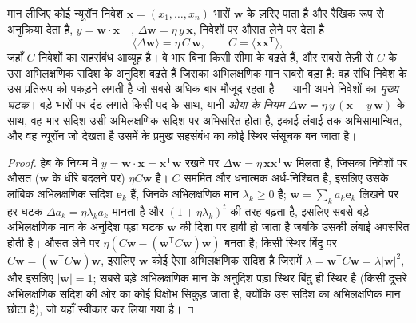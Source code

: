 \begin{theorem}[कोई हेबीय संधि क्या सीखती है]\label{thm:b3:learning-memory:hebb}
मान लीजिए कोई न्यूरॉन निवेश $\mathbf{x} = (x_{1},\dots,x_{n})$ भारों
$\mathbf{w}$ के ज़रिए पाता है
और रैखिक रूप से अनुक्रिया देता है, $y = \mathbf{w}\cdot\mathbf{x}$।
, $\Delta\mathbf{w} = \eta\, y\,\mathbf{x}$, निवेशों पर
औसत लेने पर देता है
\[
\langle\Delta\mathbf{w}\rangle = \eta\,C\,\mathbf{w}, \qquad C =
\langle\mathbf{x}\mathbf{x}^{\mathsf{T}}\rangle ,
\]
जहाँ $C$ निवेशों का सहसंबंध आव्यूह है। वे भार बिना किसी सीमा के बढ़ते
हैं, और सबसे तेज़ी से $C$ के उस अभिलक्षणिक सदिश के अनुदिश बढ़ते हैं
जिसका अभिलक्षणिक मान सबसे बड़ा है: वह संधि निवेश के उस प्रतिरूप को
पकड़ने लगती है जो सबसे अधिक बार मौजूद रहता है --- यानी अपने निवेशों का
\emph{मुख्य घटक}। बड़े भारों पर दंड लगाते किसी पद के साथ, यानी
\emph{ओया के नियम} $\Delta\mathbf{w} = \eta\, y\,(\mathbf{x} - y\,\mathbf{w})$
के साथ, वह भार-सदिश उसी अभिलक्षणिक सदिश पर अभिसरित होता है, इकाई
लंबाई तक अभिसामान्यित, और वह न्यूरॉन जो देखता है उसमें के प्रमुख
सहसंबंध का कोई स्थिर संसूचक बन जाता है।
\end{theorem}
\begin{proof}
हेब के नियम में $y = \mathbf{w}\cdot\mathbf{x} = \mathbf{x}^{\mathsf{T}}
\mathbf{w}$ रखने पर $\Delta\mathbf{w} = \eta\,\mathbf{x}
\mathbf{x}^{\mathsf{T}}\mathbf{w}$ मिलता है, जिसका निवेशों पर औसत
($\mathbf{w}$ के धीरे बदलने पर) $\eta C\mathbf{w}$ है। $C$ सममित और
धनात्मक अर्ध-निश्चित है, इसलिए उसके लांबिक अभिलक्षणिक सदिश $\mathbf{e}_{k}$
हैं, जिनके अभिलक्षणिक मान $\lambda_{k} \ge 0$ हैं; $\mathbf{w} = \sum_{k}
a_{k}\mathbf{e}_{k}$ लिखने पर हर घटक $\Delta a_{k} = \eta\lambda_{k}
a_{k}$ मानता है और $(1 + \eta\lambda_{k})^{t}$ की तरह बढ़ता है, इसलिए
सबसे बड़े अभिलक्षणिक मान के अनुदिश पड़ा घटक $\mathbf{w}$ की दिशा पर
हावी हो जाता है जबकि उसकी लंबाई अपसरित होती है।  औसत लेने
पर $\eta(C\mathbf{w} -
(\mathbf{w}^{\mathsf{T}}C\mathbf{w})\mathbf{w})$ बनता है; किसी स्थिर
बिंदु पर $C\mathbf{w} = (\mathbf{w}^{\mathsf{T}}C\mathbf{w})\mathbf{w}$,
इसलिए $\mathbf{w}$ कोई ऐसा अभिलक्षणिक सदिश है जिसमें
$\lambda = \mathbf{w}^{\mathsf{T}}
C\mathbf{w} = \lambda|\mathbf{w}|^{2}$, और इसलिए $|\mathbf{w}| = 1$;
सबसे बड़े अभिलक्षणिक मान के अनुदिश पड़ा स्थिर बिंदु ही स्थिर है (किसी
दूसरे अभिलक्षणिक सदिश की ओर का कोई विक्षोभ सिकुड़ जाता है, क्योंकि उस
सदिश का अभिलक्षणिक मान छोटा है), जो यहाँ स्वीकार कर लिया गया है।
\end{proof}


